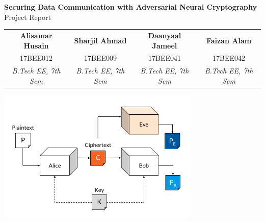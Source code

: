 \documentclass[a4paper]{article}
\begin{document}
  \newpage
  \tableofcontents
  \thispagestyle{empty}

  \newpage
  \begin{center}
    {\bfseries {\LARGE Securing Data Communication with Adversarial Neural Cryptography}}\\
    \vspace{0.025\textwidth}
    {\Large Project Report}
    \vspace{0.05\textwidth}
    
    {\small 
      \begin{center}
        \begin{tabular}{ c|c|c|c }
          {\bfseries Alisamar Husain} & 
          {\bfseries Sharjil Ahmad} & 
          {\bfseries Daanyaal Jameel} & 
          {\bfseries Faizan Alam} \\ 

          17BEE012 & 
          17BEE009 & 
          17BEE041 & 
          17BEE042 \\

          \textit{B.Tech EE, 7th Sem} &
          \textit{B.Tech EE, 7th Sem} &
          \textit{B.Tech EE, 7th Sem} &
          \textit{B.Tech EE, 7th Sem} 
        \end{tabular}
      \end{center}
    }
    \vspace{0.05\textwidth}
    
    \includegraphics[height=2.5in]{../ref/anc.png}
  \end{center}

  \begin{abstract}
    In this project, we demonstrate that neural networks can learn to protect communications, 
    and build a network which can encrypt and decrypt bit-strings.
    The learning does not require prescribing a particular set of cryptographic algorithms, 
    nor indicating ways of applying these algorithms. We do not prescribe specific
    cryptographic algorithms to these neural networks; instead, we train end-to-end,
    adversarially. We demonstrate that the neural networks can learn how to perform
    forms of encryption and decryption, and also how to apply these operations selectively
    in order to meet confidentiality goals.
  \end{abstract}
\end{document}
